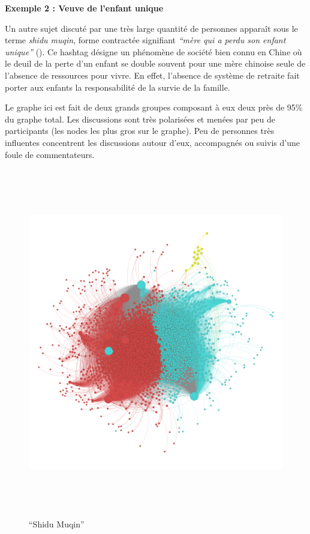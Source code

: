 \textbf{Exemple 2 : Veuve de l{\textquoteright}enfant unique}

Un autre sujet discuté par une très large quantité de personnes appara\^it sous le terme {\textquotedbl}\textit{shidu muqin}{\textquotedbl}, forme contractée signifiant \textit{{\textquotedblleft}mère qui a perdu son enfant unique{\textquotedblright}} (). Ce hashtag désigne un phénomène de société bien connu en Chine o\`u le deuil de la perte d{\textquoteright}un enfant se double souvent pour une mère chinoise seule de l{\textquoteright}absence de ressources pour vivre. En effet, l{\textquoteright}absence de système de retraite fait porter aux enfants la responsabilité de la survie de la famille.

Le graphe ici est fait de deux grands groupes composant à eux deux
près de 95\% du graphe total. Les discussions sont très
polarisées et menées par peu de participants (les nodes les plus
gros sur le graphe). Peu de personnes très influentes concentrent les
discussions autour d{\textquoteright}eux, accompagnés ou suivis
d{\textquoteright}une foule de commentateurs. 

\begin{figure}[th]
    \centering
    \includegraphics[width=6.0114in,height=6.0114in]{figures/chap3/chapitre3-img18.png}
    \caption{{\textquotedblleft}Shidu Muqin{\textquotedblright}}
\end{figure}



